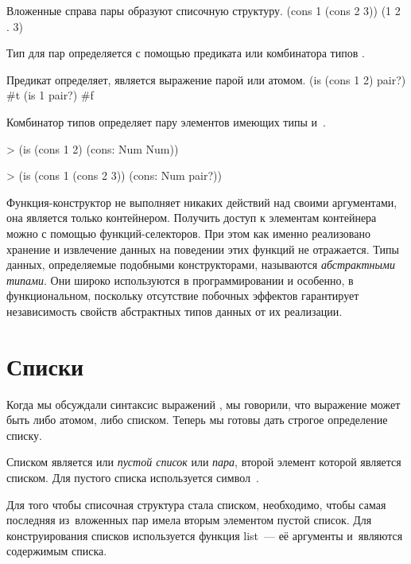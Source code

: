 \begin{example}{%
Вложенные справа пары образуют списочную структуру.}
\REPL
  {(cons 1 (cons 2 3))}
  {(1 2 . 3)}
\end{example}

Тип для пар определяется с помощью предиката  или комбинатора типов .

\begin{example}{%
Предикат  определяет, является выражение парой или атомом.}
\REPL
  {(is (cons 1 2) pair?)}
  {\#t}
\REPL
  {(is 1 pair?)}
  {\#f}
\end{example}

\begin{example}{%
Комбинатор типов  определяет пару элементов имеющих типы  и~.}
\begin{ExampleCode}
> (is (cons 1 2) 
      (cons: Num Num))
\end{ExampleCode}
\begin{ExampleCode}
> (is (cons 1 (cons 2 3)) 
      (cons: Num pair?))
\end{ExampleCode}
\end{example}
 
Функция-конструктор  не выполняет никаких действий над своими аргументами, она является только контейнером. Получить доступ к элементам контейнера можно с помощью функций-селекторов. При этом как именно реализовано хранение и извлечение данных на поведении этих функций не отражается. Типы данных, определяемые подобными конструкторами, называются \emph{абстрактными типами}. Они широко используются в программировании и особенно, в функциональном, поскольку отсутствие побочных эффектов гарантирует независимость свойств абстрактных типов данных от их реализации.

\section[2]{Списки}%
%
Когда мы обсуждали синтаксис выражений \Scheme, мы говорили, что выражение может быть либо атомом, либо списком. Теперь мы готовы дать строгое определение списку.

Списком является или \emph{пустой список} или \emph{пара}, второй элемент которой является списком. Для пустого списка используется символ~. 

Для того чтобы списочная структура стала списком, необходимо, чтобы самая последняя из~вложенных пар имела вторым элементом пустой список. Для конструирования списков используется функция \si{list}~--- её аргументы и~являются содержимым списка.

